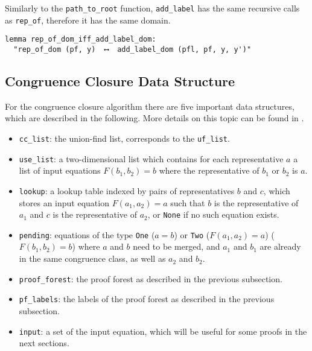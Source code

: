 Similarly to the \lstinline{path_to_root} function, \lstinline{add_label} has the same recursive calls as \lstinline{rep_of}, therefore it has the same domain.

\begin{lstlisting}
lemma rep_of_dom_iff_add_label_dom:
  "rep_of_dom (pf, y)  ⟷  add_label_dom (pfl, pf, y, y')"
\end{lstlisting}

\subsection{Congruence Closure Data Structure}
\label{subsection:datastructure}

For the congruence closure algorithm there are five important data structures, which are described in the following. More details on this topic can be found in \cite{Nieuwenhuis}.

\begin{itemize}
	\item \lstinline{cc_list}: the union-find list, corresponds to the \lstinline{uf_list}.

	\item \lstinline{use_list}: a two-dimensional list which contains for each representative $a$ a list of input equations $F(b_1, b_2) = b$ where the representative of $b_1$ or $b_2$ is $a$.

	\item \lstinline{lookup}: a lookup table indexed by pairs of representatives $b$ and $c$, which stores an input equation $F(a_1, a_2) = a$ such that $b$ is the representative of $a_1$ and $c$ is the representative of $a_2$, or \lstinline{None} if no such equation exists.

    \item \lstinline{pending}: equations of the type \lstinline{One} ($a = b$) or \lstinline{Two} ($F(a_1, a_2) = a$) ($F(b_1, b_2) = b$) where $a$ and $b$ need to be merged, and $a_1$ and $b_1$ are already in the same congruence class, as well as $a_2$ and $b_2$.

    \item \lstinline{proof_forest}: the proof forest as described in the previous subsection.

    \item \lstinline{pf_labels}: the labels of the proof forest as described in the previous subsection.

    \item \lstinline{input}: a set of the input equation, which will be useful for some proofs in the next sections.
\end{itemize}

